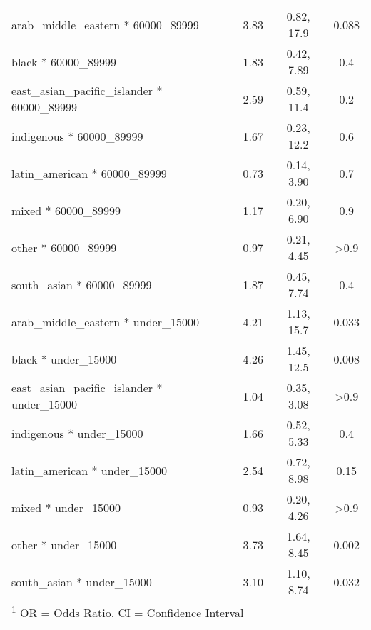 \documentclass[
  letterpaper,
  DIV=11,
  numbers=noendperiod]{scrartcl}
\begin{document}
\begin{longtable}{lccc}
\hspace{1em}arab\_middle\_eastern * 60000\_89999 & 3.83 & 0.82, 17.9 & 0.088\\
\hspace{1em}black * 60000\_89999 & 1.83 & 0.42, 7.89 & 0.4\\
\hspace{1em}east\_asian\_pacific\_islander * 60000\_89999 & 2.59 & 0.59, 11.4 & 0.2\\
\hspace{1em}indigenous * 60000\_89999 & 1.67 & 0.23, 12.2 & 0.6\\
\addlinespace
\hspace{1em}latin\_american * 60000\_89999 & 0.73 & 0.14, 3.90 & 0.7\\
\hspace{1em}mixed * 60000\_89999 & 1.17 & 0.20, 6.90 & 0.9\\
\hspace{1em}other * 60000\_89999 & 0.97 & 0.21, 4.45 & >0.9\\
\hspace{1em}south\_asian * 60000\_89999 & 1.87 & 0.45, 7.74 & 0.4\\
\hspace{1em}arab\_middle\_eastern * under\_15000 & 4.21 & 1.13, 15.7 & 0.033\\
\addlinespace
\hspace{1em}black * under\_15000 & 4.26 & 1.45, 12.5 & 0.008\\
\hspace{1em}east\_asian\_pacific\_islander * under\_15000 & 1.04 & 0.35, 3.08 & >0.9\\
\hspace{1em}indigenous * under\_15000 & 1.66 & 0.52, 5.33 & 0.4\\
\hspace{1em}latin\_american * under\_15000 & 2.54 & 0.72, 8.98 & 0.15\\
\hspace{1em}mixed * under\_15000 & 0.93 & 0.20, 4.26 & >0.9\\
\addlinespace
\hspace{1em}other * under\_15000 & 3.73 & 1.64, 8.45 & 0.002\\
\hspace{1em}south\_asian * under\_15000 & 3.10 & 1.10, 8.74 & 0.032\\*
\multicolumn{4}{l}{\rule{0pt}{1em}\textsuperscript{1} OR = Odds Ratio, CI = Confidence Interval}\\
\end{longtable}
\end{document}
